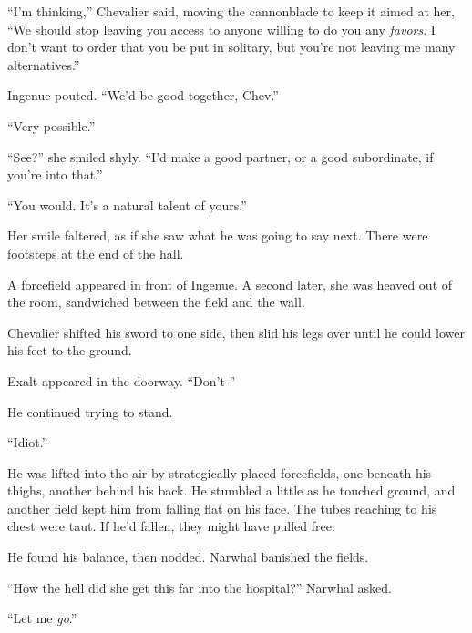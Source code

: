 ``I'm thinking,'' Chevalier said, moving the cannonblade to keep it aimed at her, ``We should stop leaving you access to anyone willing to do you any \emph{favors}.  I don't want to order that you be put in solitary, but you're not leaving me many alternatives.''



Ingenue pouted.  ``We'd be good together, Chev.''



``Very possible.''



``See?'' she smiled shyly.  ``I'd make a good partner, or a good subordinate, if you're into that.''



``You would.  It's a natural talent of yours.''



Her smile faltered, as if she saw what he was going to say next.  There were footsteps at the end of the hall.



A forcefield appeared in front of Ingenue.  A second later, she was heaved out of the room, sandwiched between the field and the wall.



Chevalier shifted his sword to one side, then slid his legs over until he could lower his feet to the ground.



Exalt appeared in the doorway.  ``Don't-''



He continued trying to stand.



``Idiot.''



He was lifted into the air by strategically placed forcefields, one beneath his thighs, another behind his back.  He stumbled a little as he touched ground, and another field kept him from falling flat on his face.  The tubes reaching to his chest were taut.  If he'd fallen, they might have pulled free.



He found his balance, then nodded.  Narwhal banished the fields.



``How the hell did she get this far into the hospital?'' Narwhal asked.



``Let me \emph{go}.''



